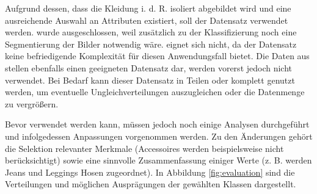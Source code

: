 Aufgrund dessen, dass die Kleidung i. d. R. isoliert abgebildet wird und eine ausreichende Auswahl an Attributen existiert, soll der  Datensatz verwendet werden.  wurde ausgeschlossen, weil zusätzlich zu der Klassifizierung noch eine Segmentierung der Bilder notwendig wäre.  eignet sich nicht, da der Datensatz keine befriedigende Komplexität für diesen Anwendungsfall bietet. Die Daten aus  stellen ebenfalls einen geeigneten Datensatz dar, werden vorerst jedoch nicht verwendet. Bei Bedarf kann dieser Datensatz in Teilen oder komplett genutzt werden, um eventuelle Ungleichverteilungen auszugleichen oder die Datenmenge zu vergrößern.

Bevor  verwendet werden kann, müssen jedoch noch einige Analysen durchgeführt und infolgedessen Anpassungen vorgenommen werden. Zu den Änderungen gehört die Selektion relevanter Merkmale (Accessoires werden beispielsweise nicht berücksichtigt) sowie eine sinnvolle Zusammenfassung einiger Werte (z. B. werden Jeans und Leggings Hosen zugeordnet). In Abbildung \ref{fig:evaluation} sind die Verteilungen und möglichen Ausprägungen der gewählten Klassen dargestellt.

